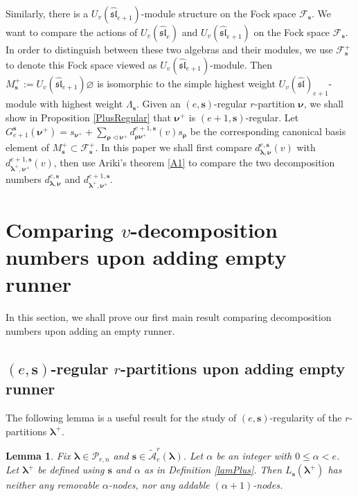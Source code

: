 \documentclass[a4paper,10pt]{amsart}
\theoremstyle{plain}
\newcommand{\bvarnothing}{{\boldsymbol \varnothing}}
\def\bs{{\boldsymbol{s}}}
\def\PP{\mathscr{P}}
\def\blam{{\boldsymbol \lambda}}
\def\brho{{\boldsymbol\rho}}
\def\bnu{{\boldsymbol \nu}}
\theoremstyle{plain}
\newtheorem{lemma}[theorem]{Lemma}
\numberwithin{equation}{section}
\begin{document}
Similarly, there is a $U_v(\widehat{\mathfrak{sl}}_{e+1})$-module structure on the Fock space $\mathcal F_\bs$. We want to compare the actions of $U_v(\widehat{\mathfrak{sl}}_e)$ and $U_v(\widehat{\mathfrak{sl}}_{e+1})$ on the Fock space $\mathcal F_\bs$. In order to distinguish between these two algebras and their modules, we use $\mathcal F_\bs^+$ to denote this Fock space viewed as $U_v(\widehat{\mathfrak{sl}}_{e+1})$-module. Then $M_\bs^+:=U_v (\widehat{\mathfrak{sl}}_{e+1})\bvarnothing$ is isomorphic to the simple highest weight $U_v(\widehat{\mathfrak{sl}})_{e+1}$-module with highest weight $\Lambda_\bs$. Given an $(e,\bs)$-regular $r$-partition $\bnu$, we shall show in Proposition \ref{PlusRegular} that $\bnu^+$ is $(e+1,\bs)$-regular. Let $G_{e+1}^\bs(\bnu^+)=s_{\bnu^+}+\sum_{\brho\lhd\bnu^+} d^{e+1,\bs}_{\brho\bnu^+}(v) s_\brho$ be the corresponding canonical basis element of $M_\bs^+ \subset \mathcal F_\bs^+$. In this paper we shall first compare $d^{e,\bs}_{\blam,\bnu}(v)$ with $d^{e+1,\bs}_{\blam^+,\bnu^+}(v)$, then use Ariki's theorem \ref{A1} to compare the two decomposition numbers $d^{e,\bs}_{\blam,\bnu}$ and $d^{e+1,\bs}_{\blam^+,\bnu^+}$.























\bigskip
\section{Comparing $v$-decomposition numbers upon adding empty runner}

In this section, we shall prove our first main result comparing decomposition numbers upon adding an empty runner.

\medskip
\subsection{$(e,\mathbf{s})$-regular $r$-partitions upon adding empty runner}
The following lemma is a useful result for the study of $(e,\bs)$-regularity of the $r$-partitions $\blam^+$.
\begin{lemma}\label{no+}
Fix $\blam\in\PP_{r,n}$ and $\bs\in\tilde{\mathcal{A}}_e^r(\blam)$. Let $\alpha$ be an integer with $0\le \alpha<e$. Let $\blam^+$ be defined using $\bs$ and $\alpha$ as in Definition \ref{lamPlus}. Then $L_\bs(\blam^+)$ has neither any removable $\alpha$-nodes, nor any addable $(\alpha+1)$-nodes.
\end{lemma}
\end{document}
